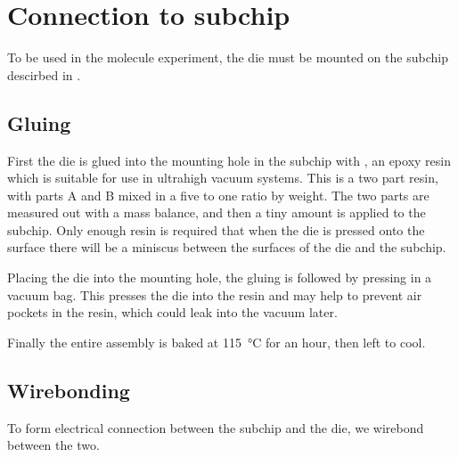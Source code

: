 \section{Connection to subchip}

To be used in the molecule experiment, the die must be mounted on the subchip
descirbed in .

\subsection{Gluing}

First the die is glued into the mounting hole in the subchip with , an epoxy resin which is suitable for use in ultrahigh vacuum systems.
This is a two part resin, with parts A and B mixed in a five to one ratio by
weight. The two parts are measured out with a mass balance, and then a tiny
amount is applied to the subchip. Only enough resin is required that when the
die is pressed onto the surface there will be a miniscus between the surfaces
of the die and the subchip.

Placing the die into the mounting hole, the gluing is followed by pressing in a
vacuum bag. This presses the die into the resin and may help to prevent air
pockets in the resin, which could leak into the vacuum later.

Finally the entire assembly is baked at \SI{115}{\celsius} for an hour, then
left to cool.

\subsection{Wirebonding}

To form electrical connection between the subchip and the die, we wirebond
between the two.
